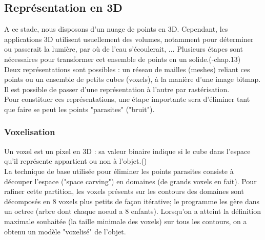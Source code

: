 \documentclass[a4paper,10pt]{report}
\begin{document}
\subsection{Représentation en 3D}
A ce stade, nous disposons d'un nuage de points en 3D. Cependant, les applications 3D utilisent usuellement des volumes, notamment pour déterminer ou passerait la lumière, par où de l'eau s'écoulerait, ... Plusieurs étapes sont nécessaires pour transformer cet ensemble de points en un solide.(\cite{shapiro}-chap.13)\\
Deux représentations sont possibles : un réseau de mailles (meshes) reliant ces points ou un ensemble de petits cubes (voxels), à la manière d'une image bitmap. Il est possible de passer d'une représentation à l'autre par rastérisation.\\
Pour constituer ces représentations, une étape importante sera d'éliminer tant que faire se peut les points "parasites" ("bruit").
\subsubsection{Voxelisation}
Un voxel est un pixel en 3D : sa valeur binaire indique si le cube dans l'espace qu'il représente appartient ou non à l'objet.(\cite{Voxelization,basdogan,pulli})\\
La technique de base utilisée pour éliminer les points parasites consiste à découper l'espace ("space carving") en domaines (de grands voxels en fait). Pour rafiner cette partition, les voxels présents sur les contours des domaines sont décomposés en 8 voxels plus petits de façon itérative; le programme les gère dans un octree (arbre dont chaque noeud a 8 enfants). Lorsqu'on a atteint la définition maximale souhaitée (la taille minimale des voxels) sur tous les contours, on a obtenu un modèle "voxelisé" de l'objet.
\end{document}
